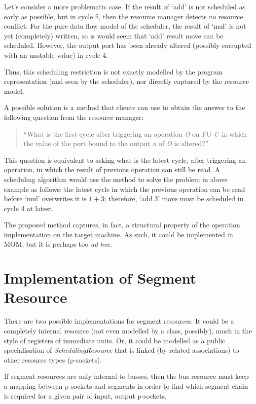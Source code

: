 \documentclass[a4paper,twoside]{tce}
\begin{document}
Let's consider a more problematic case. If the result of `add' is not
scheduled as early as possible, but in cycle 5, then the resource manager
detects no resource conflict. For the pure data flow model of the scheduler,
the result of `mul' is not yet (completely) written, so is would seem that
`add' result move can be scheduled. However, the output port has been
already altered (possibly corrupted with an unstable value) in cycle 4.

Thus, this scheduling restriction is not exactly modelled by the program
representation (and seen by the scheduler), nor directly captured by the
resource model.

A possible solution is a method that clients can use to obtain the answer to
the following question from the resource manager:
\begin{quote}
  ``What is the first cycle after triggering an operation \emph{O} on FU
  \emph{U} in which the value of the port bound to the output \emph{n} of
  \emph{O} is altered?''
\end{quote}

This question is equivalent to asking what is the latest cycle, after
triggering an operation, in which the result of previous operation can still
be read.
%
A scheduling algorithm would use the method to solve the problem in above
example as follows: the latest cycle in which the previous operation can be
read before `mul' overwrites it is $1+3$; therefore, `add.3' move must be
scheduled  in cycle 4 at latest.

The proposed method captures, in fact, a structural property of the
operation implementation on the target machine. As such, it could be
implemented in MOM, but it is perhaps too \emph{ad hoc}.

\section{Implementation of Segment Resource}
\label{ch:pending:segment-resource}

There are two possible implementations for segment resources. It could be a
completely internal resource (not even modelled by a class, possibly), much
in the style of registers of immediate units. Or, it could be modelled as a
public specialisation of \emph{SchedulingResource} that is linked (by
related associations) to other resource types (p-sockets).

If segment resources are only internal to busses, then the bus resource must
keep a mapping between p-sockets and segments in order to find which segment
chain is required for a given pair of input, output p-sockets.
\end{document}
